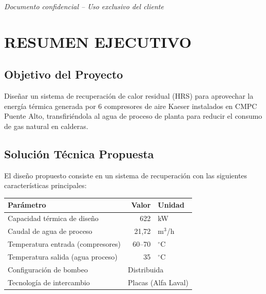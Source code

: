 \documentclass[12pt,a4paper]{article}
\begin{document}
\begin{titlepage}
    \vfill
    
    {\small\textit{Documento confidencial -- Uso exclusivo del cliente}}
    
\end{titlepage}

\tableofcontents
\newpage

\section*{RESUMEN EJECUTIVO}

\subsection*{Objetivo del Proyecto}

Diseñar un sistema de recuperación de calor residual (HRS) para aprovechar la energía térmica generada por 6 compresores de aire Kaeser instalados en CMPC Puente Alto, transfiriéndola al agua de proceso de planta para reducir el consumo de gas natural en calderas.

\subsection*{Solución Técnica Propuesta}

El diseño propuesto consiste en un sistema de recuperación con las siguientes características principales:

\begin{table}[h]
\centering
\begin{tabular}{lrl}
\toprule
\textbf{Parámetro} & \textbf{Valor} & \textbf{Unidad} \\
\midrule
Capacidad térmica de diseño & 622 & kW \\
Caudal de agua de proceso & 21,72 & m$^3$/h \\
Temperatura entrada (compresores) & 60--70 & $^\circ$C \\
Temperatura salida (agua proceso) & 35 & $^\circ$C \\
Configuración de bombeo & \multicolumn{2}{l}{Distribuida} \\
Tecnología de intercambio & \multicolumn{2}{l}{Placas (Alfa Laval)} \\
\bottomrule
\end{tabular}
\end{table}
\end{document}
